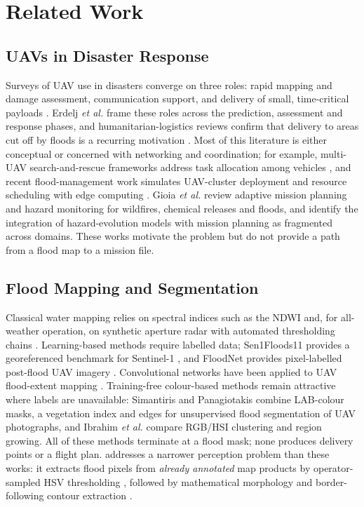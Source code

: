 \section{Related Work}
\label{sec:related}

\subsection{UAVs in Disaster Response}
Surveys of UAV use in disasters converge on three roles: rapid mapping and damage assessment, communication support, and delivery of small, time-critical payloads \cite{erdelj2017help,mohddaud2022applications,khan2022emerging}. Erdelj \emph{et al.} \cite{erdelj2017help} frame these roles across the prediction, assessment and response phases, and humanitarian-logistics reviews confirm that delivery to areas cut off by floods is a recurring motivation \cite{rejeb2021humanitarian}. Most of this literature is either conceptual or concerned with networking and coordination; for example, multi-UAV search-and-rescue frameworks address task allocation among vehicles \cite{alotaibi2019lsar}, and recent flood-management work simulates UAV-cluster deployment and resource scheduling with edge computing \cite{li2025urban}. Gioia \emph{et al.} \cite{gioia2026perspective} review adaptive mission planning and hazard monitoring for wildfires, chemical releases and floods, and identify the integration of hazard-evolution models with mission planning as fragmented across domains. These works motivate the problem but do not provide a path from a flood map to a mission file.

\subsection{Flood Mapping and Segmentation}
Classical water mapping relies on spectral indices such as the NDWI \cite{mcfeeters1996ndwi} and, for all-weather operation, on synthetic aperture radar with automated thresholding chains \cite{twele2016sentinel}. Learning-based methods require labelled data; Sen1Floods11 provides a georeferenced benchmark for Sentinel-1 \cite{bonafilia2020sen1floods11}, and FloodNet provides pixel-labelled post-flood UAV imagery \cite{rahnemoonfar2021floodnet}. Convolutional networks have been applied to UAV flood-extent mapping \cite{gebrehiwot2019deep}. Training-free colour-based methods remain attractive where labels are unavailable: Simantiris and Panagiotakis \cite{simantiris2024unsupervised} combine LAB-colour masks, a vegetation index and edges for unsupervised flood segmentation of UAV photographs, and Ibrahim \emph{et al.} \cite{ibrahim2021application} compare RGB/HSI clustering and region growing. All of these methods terminate at a flood mask; none produces delivery points or a flight plan. \adapt{} addresses a narrower perception problem than these works: it extracts flood pixels from \emph{already annotated} map products by operator-sampled HSV thresholding \cite{smith1978color}, followed by mathematical morphology \cite{haralick1987image} and border-following contour extraction \cite{suzuki1985topological}.

